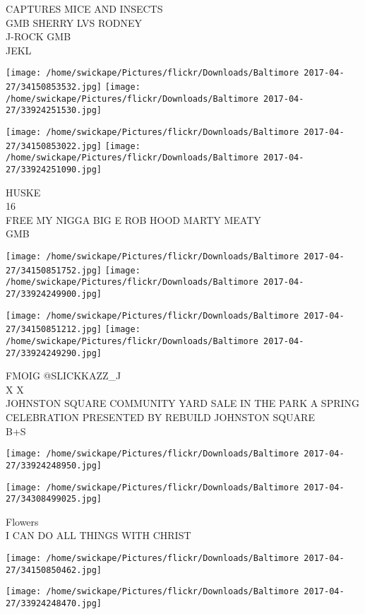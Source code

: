 \documentclass[10pt,letterpaper]{article}
\begin{document}
CAPTURES MICE AND INSECTS\\
GMB SHERRY LVS RODNEY\\
J{-}ROCK GMB\\
JEKL
\pagebreak

\texttt{[image: /home/swickape/Pictures/flickr/Downloads/Baltimore 2017-04-27/34150853532.jpg]}
\texttt{[image: /home/swickape/Pictures/flickr/Downloads/Baltimore 2017-04-27/33924251530.jpg]}

\texttt{[image: /home/swickape/Pictures/flickr/Downloads/Baltimore 2017-04-27/34150853022.jpg]}
\texttt{[image: /home/swickape/Pictures/flickr/Downloads/Baltimore 2017-04-27/33924251090.jpg]}

HUSKE\\
16\\
FREE MY NIGGA BIG E ROB HOOD MARTY MEATY\\
GMB
\pagebreak

\texttt{[image: /home/swickape/Pictures/flickr/Downloads/Baltimore 2017-04-27/34150851752.jpg]}
\texttt{[image: /home/swickape/Pictures/flickr/Downloads/Baltimore 2017-04-27/33924249900.jpg]}

\texttt{[image: /home/swickape/Pictures/flickr/Downloads/Baltimore 2017-04-27/34150851212.jpg]}
\texttt{[image: /home/swickape/Pictures/flickr/Downloads/Baltimore 2017-04-27/33924249290.jpg]}

FMOIG @SLICKKAZZ\_J\\
X X\\
JOHNSTON SQUARE COMMUNITY YARD SALE IN THE PARK A SPRING CELEBRATION PRESENTED BY REBUILD JOHNSTON SQUARE\\
B+S
\pagebreak

\texttt{[image: /home/swickape/Pictures/flickr/Downloads/Baltimore 2017-04-27/33924248950.jpg]}

\vspace{0.25in}
\texttt{[image: /home/swickape/Pictures/flickr/Downloads/Baltimore 2017-04-27/34308499025.jpg]}

Flowers\\
I CAN DO ALL THINGS WITH CHRIST
\pagebreak

\texttt{[image: /home/swickape/Pictures/flickr/Downloads/Baltimore 2017-04-27/34150850462.jpg]}

\vspace{0.25in}
\texttt{[image: /home/swickape/Pictures/flickr/Downloads/Baltimore 2017-04-27/33924248470.jpg]}
\end{document}
